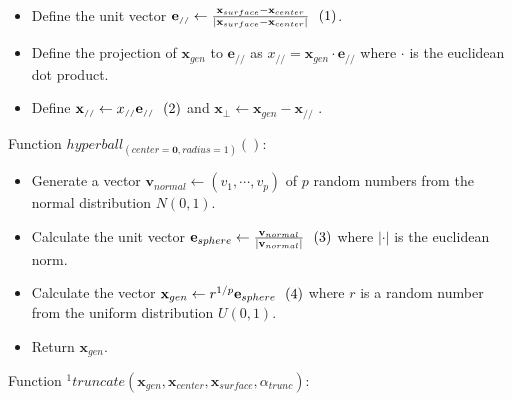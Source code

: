 \documentclass[parskip=full]{scrartcl}
\newcommand{\inlineeqnum}{\refstepcounter{equation}~~\mbox{(\theequation)}}
\begin{document}
\begin{itemize}

	\item[] Define the unit vector \( \textbf{e}_{\scriptscriptstyle//} \leftarrow \frac{\textbf{x}_{surface} - \textbf{x}_{center}}{|\textbf{x}_{surface} - \textbf{x}_{center}|} \inlineeqnum\label{eqn:unit} \).

	\item[] Define the projection of \( \textbf{x}_{gen} \) to \( \textbf{e}_{\scriptscriptstyle//} \) as \( x_{\scriptscriptstyle//} = \textbf{x}_{gen} \cdot \textbf{e}_{\scriptscriptstyle//} \) where \( \cdot \) is the euclidean dot product.

	\item[] Define \( \textbf{x}_{\scriptscriptstyle//} \leftarrow x_{\scriptscriptstyle//} \textbf{e}_{\scriptscriptstyle//}  \inlineeqnum\label{eqn:parallel} \) and \( \textbf{x}_{\bot} \leftarrow \textbf{x}_{gen} - \textbf{x}_{\scriptscriptstyle//}  \) .

\end{itemize}

Function \( hyperball_{(center = \textbf{0}, radius = 1)}() \):

\begin{itemize}

	\item[] Generate a vector \( \textbf{v}_{normal} \leftarrow (v_{1}, \cdots, v_{p}) \) of \( p \) random numbers from the normal distribution \( N(0, 1) \).

	\item[] Calculate the unit vector \( \textbf{e}_{sphere} \leftarrow \frac{\textbf{v}_{normal}}{|\textbf{v}_{normal}|} \inlineeqnum\label{eqn:sphere} \) where \( |\cdot| \) is the euclidean norm.

	\item[] Calculate the vector \( \textbf{x}_{gen} \leftarrow r^{1 / p} \textbf{e}_{sphere} \inlineeqnum\label{eqn:ball} \) where \( r \) is a random number from the uniform distribution \( U(0, 1) \).

	\item[] Return \( \textbf{x}_{gen} \).

\end{itemize}

Function \( ^{1} \)\( truncate(\textbf{x}_{gen}, \textbf{x}_{center}, \textbf{x}_{surface}, \alpha_{trunc}) \):
\end{document}
